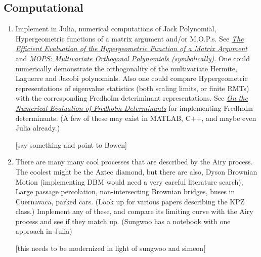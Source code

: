 \documentclass{article}
\begin{document}
\subsection*{Computational}
\begin{enumerate}
    \item Implement in Julia, numerical computations of Jack Polynomial, Hypergeometric functions of a matrix argument and/or M.O.P.s. See \href{https://arxiv.org/pdf/math/0505344.pdf}{\emph{\color{blue}The Efficient Evaluation of the Hypergeometric Function of a Matrix Argument}} and \href{https://arxiv.org/pdf/math-ph/0409066.pdf}{\emph{\color{blue}MOPS: Multivariate Orthogonal Polynomials (symbolically)}}. One could numerically demonstrate the orthogonality of the multivariate Hermite, Laguerre and Jacobi polynomials. Also one could compare Hypergeometric representations of eigenvalue statistics (both scaling limits, or finite RMTs) with the corresponding Fredholm deteriminant representations. See \href{https://arxiv.org/pdf/0804.2543.pdf}{\emph{\color{blue}On the Numerical Evaluation of Fredholm Determinants}} for implementing Fredholm determinants. (A few of these may exist in MATLAB, C++, and maybe even Julia already.)
    
    
    [say something and point to Bowen]
    
    
    \item There are many many cool processes that are described by the Airy process. The coolest might be the Aztec diamond, but there are also, Dyson Brownian Motion (implementing DBM would need a very careful literature search), Large passage percolation, non-intersecting Brownian bridges, buses in Cuernavaca, parked cars. (Look up for various papers describing the KPZ class.) Implement any of these, and compare its limiting curve with the Airy process and see if they match up. (Sungwoo has a notebook with one approach in Julia)
    
    [this needs to be modernized in light of sungwoo and simeon[
    

\end{enumerate}
\end{document}
